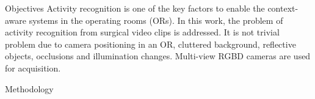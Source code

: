 \documentclass[final,hyperref={pdfpagelabels=false}]{beamer}
\begin{document}
\begin{frame}[t]
\begin{columns}[t]
\begin{column}{.465\textwidth}
\begin{block}{Objectives}
Activity recognition is one of the key factors to enable the context-aware systems in the operating rooms (ORs). In this work, the problem of activity recognition from surgical video clips is addressed. It is not trivial problem due to camera positioning in an OR, cluttered background, reflective objects, occlusions and illumination changes. Multi-view RGBD cameras are used for acquisition.

\end{block}

            
\begin{block}{Methodology}


\end{block}
\end{column}
\end{columns}
\end{frame}
\end{document}
